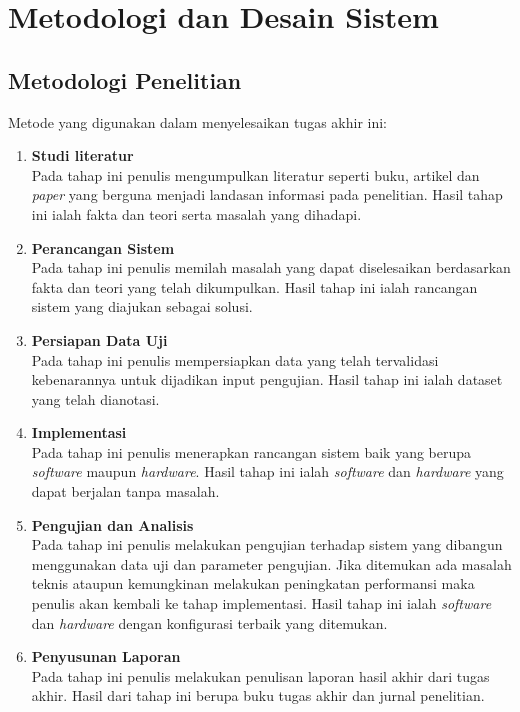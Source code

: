 \chapter{Metodologi dan Desain Sistem}
\section{Metodologi Penelitian}
Metode yang digunakan dalam menyelesaikan tugas akhir ini:
\begin{enumerate}
	\item \textbf{Studi literatur} \\
	Pada tahap ini penulis mengumpulkan literatur seperti buku, artikel dan \textit{paper} yang berguna menjadi landasan informasi pada penelitian. Hasil tahap ini ialah fakta dan teori serta masalah yang dihadapi.
	\item \textbf{Perancangan Sistem} \\
	Pada tahap ini penulis memilah masalah yang dapat diselesaikan berdasarkan fakta dan teori yang telah dikumpulkan. Hasil tahap ini ialah rancangan sistem yang diajukan sebagai solusi.
	\item \textbf{Persiapan Data Uji} \\
	Pada tahap ini penulis mempersiapkan data yang telah tervalidasi kebenarannya untuk dijadikan input pengujian. Hasil tahap ini ialah dataset yang telah dianotasi.
	\item \textbf{Implementasi} \\
	Pada tahap ini penulis menerapkan rancangan sistem baik yang berupa \textit{software} maupun \textit{hardware}. Hasil tahap ini ialah \textit{software} dan \textit{hardware} yang dapat berjalan tanpa masalah.
	\item \textbf{Pengujian dan Analisis} \\
	Pada tahap ini penulis melakukan pengujian terhadap sistem yang dibangun menggunakan data uji dan parameter pengujian. Jika ditemukan ada masalah teknis ataupun kemungkinan melakukan peningkatan performansi maka penulis akan kembali ke tahap implementasi. Hasil tahap ini ialah \textit{software} dan \textit{hardware} dengan konfigurasi terbaik yang ditemukan.
	\item \textbf{Penyusunan Laporan} \\
	Pada tahap ini penulis melakukan penulisan laporan hasil akhir dari tugas akhir. Hasil dari tahap ini berupa buku tugas akhir dan jurnal penelitian.
\end{enumerate}

